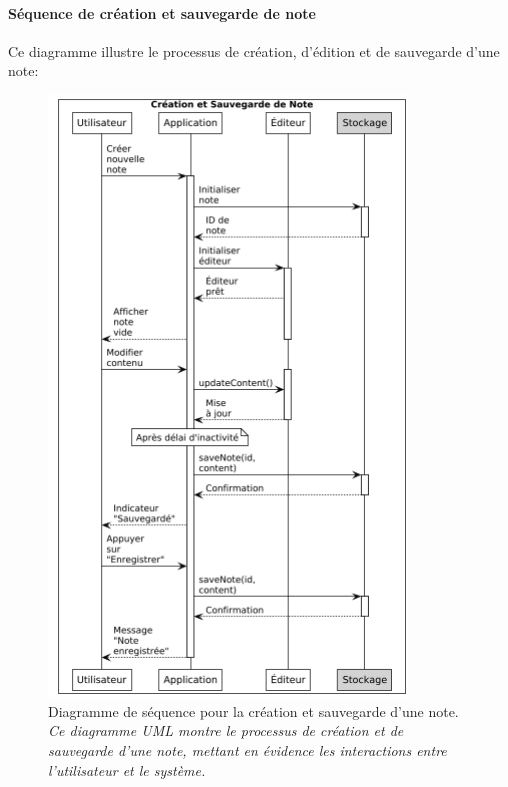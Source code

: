     \paragraph{Séquence de création et sauvegarde de note}
    
    Ce diagramme illustre le processus de création, d'édition et de sauvegarde d'une note:
    
        \begin{figure}[htbp]
        \centering
        \includegraphics[width=0.85\textwidth]{assets/docs/SayNote_sequence_save.png}
        \caption{Diagramme de séquence pour la création et sauvegarde d'une note. \newline\textit{Ce diagramme UML montre le processus de création et de sauvegarde d'une note, mettant en évidence les interactions entre l'utilisateur et le système.}}
        \label{fig:sequence_save_note}
    \end{figure}
    
